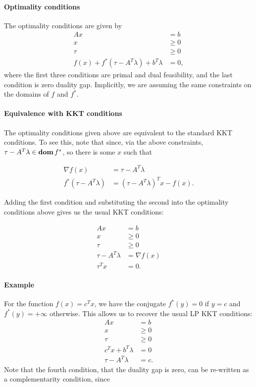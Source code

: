 \documentclass{article}
\begin{document}
\paragraph{Optimality conditions}
The optimality conditions are given by
\begin{align*}
A x &= b \\
x &\geq 0 \\
\tau &\geq 0 \\
f(x) + f^*(\tau - A^T \lambda) + b^T \lambda &= 0,
\end{align*}
where the first three conditions are primal and dual feasibility,
and the last condition is zero duality gap.
Implicitly, we are assuming the same constraints on the domains of $f$ and $f^*$.

\paragraph{Equivalence with KKT conditions}
The optimality conditions given above are equivalent to the standard KKT
conditions. To see this, note that since, via the above constraints,
$\tau - A^T \lambda \in \mathop{\bf dom} f^*$, so there is some $x$ such that

\begin{align*}
\nabla f(x) &= \tau - A^T \lambda \\
f^*(\tau - A^T \lambda) &= \left( \tau - A^T \lambda \right)^T x - f(x).
\end{align*}

Adding the first condition and substituting the second into the optimality
conditions above gives us the usual KKT conditions:

\begin{align*}
A x &= b \\
x &\geq 0 \\
\tau &\geq 0 \\
\tau - A^T \lambda &= \nabla f(x)\\
\tau^T x &= 0.
\end{align*}

\paragraph{Example}
For the function $f(x) = c^T x$, we have the conjugate
$f^*(y) = 0$ if $y=c$ and $f^*(y) = +\infty$ otherwise.
This allows us to recover the usual LP KKT conditions:
\begin{align*}
A x &= b \\
x &\geq 0 \\
\tau &\geq 0 \\
c^T x + b^T \lambda &= 0\\
\tau - A^T \lambda &= c.
\end{align*}
Note that the fourth condition, that the duality gap is zero, can be
re-written as a complementarity condition, since
\end{document}
